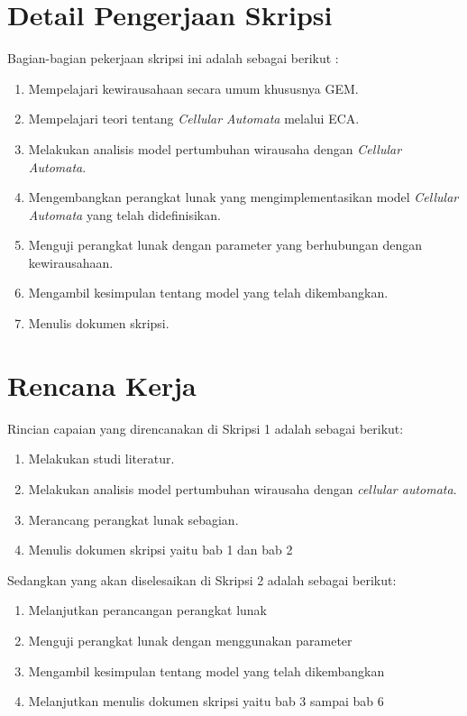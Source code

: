 \documentclass[a4paper,twoside]{article}
\begin{document}
\section{Detail Pengerjaan Skripsi}
Bagian-bagian pekerjaan skripsi ini adalah sebagai berikut :
	\begin{enumerate}
		\item Mempelajari kewirausahaan secara umum khususnya GEM.
		\item Mempelajari teori tentang \textit{Cellular Automata} melalui ECA.
		\item Melakukan analisis model pertumbuhan wirausaha dengan \textit{Cellular Automata}.
		\item Mengembangkan perangkat lunak yang mengimplementasikan model \textit{Cellular Automata} yang telah didefinisikan.
		\item Menguji perangkat lunak dengan parameter yang berhubungan dengan kewirausahaan.
		\item Mengambil kesimpulan tentang model yang telah dikembangkan.
		\item Menulis dokumen skripsi.
	\end{enumerate}

\section{Rencana Kerja}
Rincian capaian yang direncanakan di Skripsi 1 adalah sebagai berikut:
\begin{enumerate}
	\item Melakukan studi literatur.
	\item Melakukan analisis model pertumbuhan wirausaha dengan \textit{cellular automata}.
	\item Merancang perangkat lunak sebagian.
	\item Menulis dokumen skripsi yaitu bab 1 dan bab 2
\end{enumerate}
Sedangkan yang akan diselesaikan di Skripsi 2 adalah sebagai berikut:
\begin{enumerate}
	\item Melanjutkan perancangan perangkat lunak
	\item Menguji perangkat lunak dengan menggunakan parameter
	\item Mengambil kesimpulan tentang model yang telah dikembangkan
	\item Melanjutkan menulis dokumen skripsi yaitu bab 3 sampai bab 6
\end{enumerate}
\end{document}
